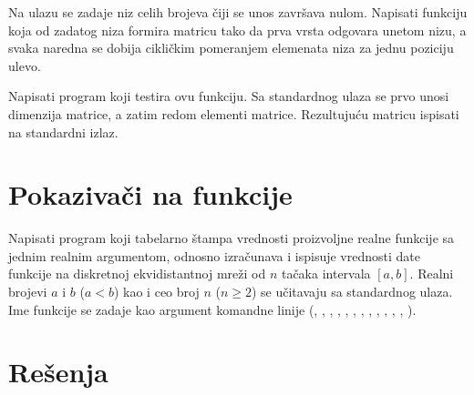 \begin{Exercise}[label=344]
Na ulazu se zadaje niz celih brojeva čiji se unos završava nulom.
Napisati funkciju koja od zadatog niza formira matricu tako da
prva vrsta odgovara unetom nizu, a svaka naredna se dobija
cikličkim pomeranjem elemenata niza za jednu poziciju ulevo.

Napisati program koji testira ovu funkciju. Sa standardnog ulaza
se prvo unosi dimenzija matrice, a zatim redom elementi matrice.
Rezultujuću matricu ispisati na standardni izlaz.
\end{Exercise}
\begin{Answer}[ref=344]
\end{Answer}

\section{Pokazivači na funkcije}

\begin{Exercise}[label=345]
Napisati program koji tabelarno štampa vrednosti proizvoljne realne funkcije sa jednim realnim
argumentom, odnosno izračunava i ispisuje
vrednosti date funkcije na diskretnoj ekvidistantnoj mreži od
$n$ tačaka intervala $[a, b]$. Realni brojevi
$a$ i $b$ ($a<b$) kao i ceo broj $n$
($n \geq 2$) se učitavaju sa standardnog ulaza. Ime funkcije
se zadaje kao argument komandne linije (, , , ,
, , , , , , , , ).
\end{Exercise}
\begin{Answer}[ref=345]
\end{Answer}

\section{Rešenja}
\shipoutAnswer
